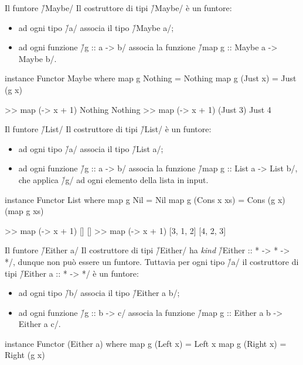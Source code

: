 \begin{frame}[fragile]{\secname}{Il funtore \h/Maybe/}
Il costruttore di tipi \h/Maybe/ è un funtore:
\begin{itemize}[<+(1)->]
\item ad ogni tipo \h/a/ associa il tipo \h/Maybe a/;
\item ad ogni funzione \h/g :: a -> b/ associa la funzione \h/map g :: Maybe a -> Maybe b/.
\end{itemize}
\pause

\begin{haskellcode}
instance Functor Maybe where
    map g Nothing = Nothing
    map g (Just x) = Just (g x)
\end{haskellcode}
\pause

\begin{runhaskell}
>>  map (\x -> x + 1) Nothing
    Nothing
>>  map (\x -> x + 1) (Just 3)
    Just 4
\end{runhaskell}
\end{frame}

\begin{frame}[fragile]{\secname}{Il funtore \h/List/}
Il costruttore di tipi \h/List/ è un funtore:
\begin{itemize}[<+(1)->]
\item ad ogni tipo \h/a/ associa il tipo \h/List a/;
\item ad ogni funzione \h/g :: a -> b/ associa la funzione \h/map g :: List a -> List b/, che applica \h/g/ ad ogni elemento della lista in input.
\end{itemize}
\pause

\begin{haskellcode}
instance Functor List where
    map g Nil = Nil
    map g (Cons x xs) = Cons (g x) (map g xs)
\end{haskellcode}
\pause

\begin{runhaskell}
>>  map (\x -> x + 1) []
    []
>>  map (\x -> x + 1) [3, 1, 2]
    [4, 2, 3]
\end{runhaskell}
\end{frame}


\begin{frame}[fragile]{\secname}{Il funtore \h/Either a/}
Il costruttore di tipi \h/Either/ ha \emph{kind} \h/Either :: * -> * -> */, dunque non può essere un funtore. Tuttavia per ogni tipo \h/a/ il costruttore di tipi \h/Either a :: * -> */ è un funtore:

\begin{itemize}[<+(1)->]
\item ad ogni tipo \h/b/ associa il tipo \h/Either a b/;
\item ad ogni funzione \h/g :: b -> c/ associa la funzione \h/map g :: Either a b -> Either a c/.
\end{itemize}
\pause

\begin{haskellcode}
instance Functor (Either a) where
    map g (Left x) = Left x
    map g (Right x) = Right (g x)
\end{haskellcode}
\end{frame}


